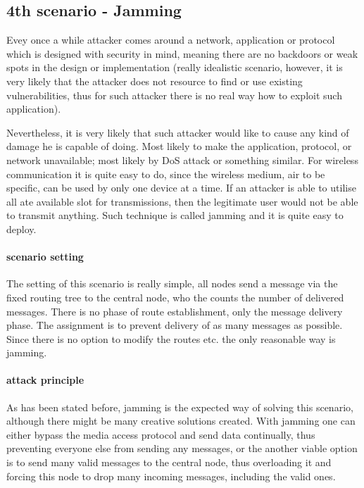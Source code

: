 \documentclass[
  print, %
  Table,   %
  nolof,     %
  nolot,     %
           oneside
]{fithesis3}
\begin{document}
    \subsection{4th scenario - Jamming} \label{subsec:4th}
    Evey once a while attacker comes around a network, application or protocol which is designed with security in mind, meaning there are no backdoors or weak spots in the design or implementation (really idealistic scenario, however, it is very likely that the attacker does not resource to find or use existing vulnerabilities, thus for such attacker there is no real way how to exploit such application).

    Nevertheless, it is very likely that such attacker would like to cause any kind of damage he is capable of doing. Most likely to make the application, protocol, or network unavailable; most likely by DoS attack %
    or something similar. For wireless communication it is quite easy to do, since the wireless medium, air to be specific, can be used by only one device at a time. If an attacker is able to utilise all ate available slot for transmissions, then the legitimate user would not be able to transmit anything. Such technique is called jamming and it is quite easy to deploy.

    \paragraph{scenario setting}
    The setting of this scenario is really simple, all nodes send a message via the fixed routing tree to the central node, who the counts the number of delivered messages. There is no phase of route establishment, only the message delivery phase. The assignment is to prevent delivery of as many messages as possible. Since there is no option to modify the routes etc. the only reasonable way is jamming.

    \paragraph{attack principle}
    As has been stated before, jamming is the expected way of solving this scenario, although there might be many creative solutions created. With jamming one can either bypass the media access protocol and send data continually, thus preventing everyone else from sending any messages, or the another viable option is to send many valid messages to the central node, thus overloading it and forcing this node to drop many incoming messages, including the valid ones.
\end{document}
